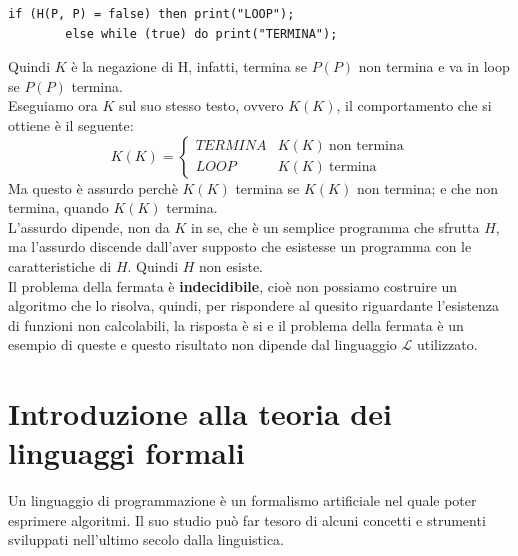 \documentclass[12pt]{report}
\begin{document}
	\begin{lstlisting}[style=pascalstyle]
	if (H(P, P) = false) then print("LOOP");
		else while (true) do print("TERMINA");
	\end{lstlisting}
	Quindi $K$ è la negazione di H, infatti, termina se $P(P)$ non termina e va in loop se $P(P)$ termina. \\
	Eseguiamo ora $K$ sul suo stesso testo, ovvero $K(K)$, il comportamento che si ottiene è il seguente:
	\[
	K(K) = \begin{cases}
		TERMINA & K(K) \ \text{non termina} \\
		LOOP & K(K) \ \text{termina}
	\end{cases}
	\]
	Ma questo è assurdo perchè $K(K)$ termina se $K(K)$ non termina; e che non termina, quando $K(K)$ termina. \\
	L'assurdo dipende, non da $K$ in se, che è un semplice programma che sfrutta $H$, ma l'assurdo discende dall'aver supposto che esistesse un programma con le caratteristiche di $H$. Quindi $H$ non esiste. \\
	Il problema della fermata è \textbf{indecidibile}, cioè non possiamo costruire un algoritmo che lo risolva, quindi, per rispondere al quesito riguardante l'esistenza di funzioni non calcolabili, la risposta è si e il problema della fermata è un esempio di queste e questo risultato non dipende dal linguaggio $\mathcal{L}$ utilizzato.
	\section{Introduzione alla teoria dei linguaggi formali}
	Un linguaggio di programmazione è un formalismo artificiale nel quale poter esprimere algoritmi. Il suo studio può far tesoro di alcuni concetti e strumenti sviluppati nell'ultimo secolo dalla linguistica.
\end{document}
